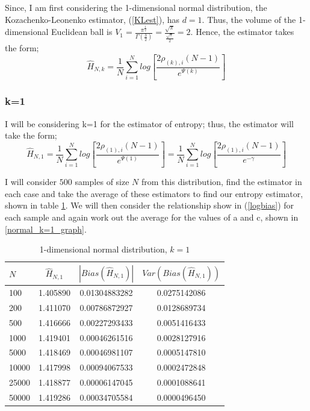 \documentclass{article}
\begin{document}
Since, I am first considering the 1-dimensional normal distribution, the Kozachenko-Leonenko estimator, (\ref{KLest}), has $d=1$. Thus, the volume of the 1-dimensional Euclidean ball is $V_{1} = \frac{\pi^{\frac{1}{2}}}{\Gamma(\frac{3}{2})} = \frac{\sqrt{\pi}}{\frac{\sqrt{\pi}}{2}} = 2$. Hence, the estimator takes the form;
\begin{equation}
\hat{H}_{N, k} =  \frac{1}{N} \sum_{i=1}^{N} log \left[ \frac{2\rho_{(k),i}(N-1)}{e^{\Psi(k)}} \right]\nonumber
\end{equation}




\subsubsection{k=1} \label{N_k=1}
I will be considering k=1 for the estimator of entropy; thus, the estimator will take the form;
\begin{equation} 
\hat{H}_{N, 1} = \frac{1}{N} \sum_{i=1}^{N} log \left[ \frac{2\rho_{(1),i} (N-1)}{e^{\Psi(1)}} \right] = \frac{1}{N} \sum_{i=1}^{N} log \left[ \frac{2\rho_{(1),i} (N-1)}{e^{-\gamma}} \right] \nonumber
\end{equation}

I will consider $500$ samples of size $N$ from this distribution, find the estimator in each case and take the average of these estimators to find our entropy estimator, shown in table \ref{normal_k=1_table}. We will then consider the relationship show in (\ref{logbias}) for each sample and again work out the average for the values of a and c, shown in \ref{normal_k=1_graph}.

\begin{table}
\caption{1-dimensional normal distribution, $k=1$} \label{normal_k=1_table}
\begin{center}
\begin{tabular}{| l | c c c|} 
\toprule
$N$ & $\hat{H}_{N, 1}$ & $|Bias(\hat{H}_{N, 1})|$ & $Var(Bias(\hat{H}_{N, 1}))$ \\
\midrule[1pt]
100     & 1.405890     & 0.01304883282     & 0.0275142086  \\
200     & 1.411070     & 0.00786872927     & 0.0128689734  \\
500     & 1.416666     & 0.00227293433     & 0.0051416433  \\
1000    & 1.419401     & 0.00046261516     & 0.0028127916  \\
5000    & 1.418469     & 0.00046981107     & 0.0005147810  \\
10000   & 1.417998     & 0.00094067533     & 0.0002472848  \\
25000   & 1.418877     & 0.00006147045     & 0.0001088641  \\
50000   & 1.419286     & 0.00034705584     & 0.0000496450  \\
\hline
\end{tabular}
\end{center}
\end{table}
\end{document}

